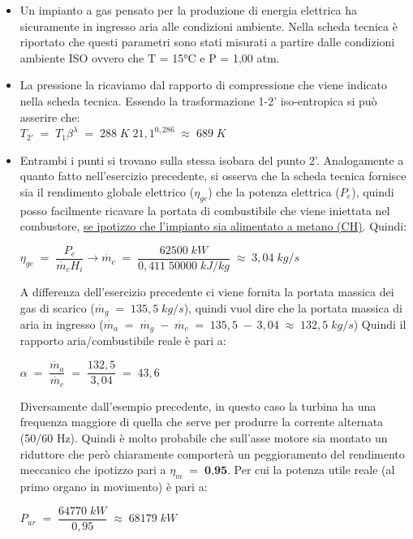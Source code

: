 \documentclass[a4paper, twoside, 12pt]{report}
\begin{document}
\begin{itemize}
	\item[\textbf{Stato 1  }] Un impianto a gas pensato per la produzione di energia elettrica ha sicuramente in ingresso aria alle condizioni ambiente. Nella scheda tecnica è riportato che questi parametri sono stati misurati a partire dalle condizioni ambiente ISO ovvero che T = 15°C e P = 1,00 atm. 
	\item[\textbf{Stato 2'}] La pressione la ricaviamo dal rapporto di compressione che viene indicato nella scheda tecnica. Essendo la trasformazione 1-2' iso-entropica si può asserire che:\\
	$T_{2'}\;=\;T_{1}\beta^{\lambda}\;=\;288\;K\;21,1^{0,286}\;\approx\;689\;K$
	\item[\textbf{Stato 2 e 3  }] Entrambi i punti si trovano sulla stessa isobara del punto 2'. Analogamente a quanto fatto nell'esercizio precedente, si osserva che la scheda tecnica fornisce sia il rendimento globale elettrico ($\eta_{ge}$) che la potenza elettrica ($P_{e}$), quindi posso facilmente ricavare la portata di combustibile che viene iniettata nel combustore, \uline{se ipotizzo che l'impianto sia alimentato a metano (CH)}. Quindi:
	\begin{center}
		$\eta_{ge}\;=\;\dfrac{P_{e}}{\dot{m_{c}}H_{i}}\to\dot{m_{c}}\;=\;\dfrac{62500\;kW}{0,411\;50000\;kJ/kg}\;\approx\;3,04\;kg/s $
	\end{center}
	A differenza dell'esercizio precedente ci viene fornita la portata massica dei gas di scarico ($\dot{m_{g}}\;=\;135,5\;kg/s$), quindi vuol dire che la portata massica di aria in ingresso ($\dot{m_{a}}\;=\;\dot{m_{g}}\;-\;\dot{m_{c}}\;=\;135,5\;-\,3,04\;\approx\;132,5\;kg/s$)
	Quindi il rapporto aria/combustibile reale è pari a:
	\begin{center}
		$\alpha\;=\;\dfrac{\dot{m_{a}}}{\dot{m_{c}}}\;=\;\dfrac{132,5}{3,04}\;=\;43,6$
	\end{center}
	Diversamente dall'esempio precedente, in questo caso la turbina ha una frequenza maggiore di quella che serve per produrre la corrente alternata (50/60 Hz). Quindi è molto probabile che sull'asse motore sia montato un riduttore che però chiaramente comporterà un peggioramento del rendimento meccanico che ipotizzo pari a $\eta_{m}\;=\;\textbf{0,95}$. Per cui la potenza utile reale (al primo organo in movimento) è pari a:
	\begin{center}
		$P_{ur}\;=\;\dfrac{64770\;kW}{0,95}\;\approx\;68179\;kW$
	\end{center}

\end{itemize}
\end{document}
